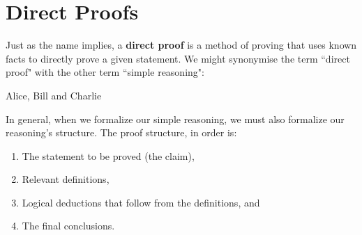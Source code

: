 \documentclass[../proofs.tex]{subfiles}
\begin{document}
\chapter{Direct Proofs}
 Just as the name implies, a \textbf{direct proof} is a method of proving that
 uses known facts to directly prove a given statement. We might synonymise the
 term ``direct proof" with the other term ``simple reasoning":

 \begin{expl}{Alice, Bill and Charlie}

 \end{expl}

 In general, when we formalize our simple reasoning, we must also formalize our
 reasoning's structure. The proof structure, in order is:

 \begin{enumerate}
   \item The statement to be proved (the claim),
   \item Relevant definitions,
   \item Logical deductions that follow from the definitions, and
   \item The final conclusions.
 \end{enumerate}
\end{document}
